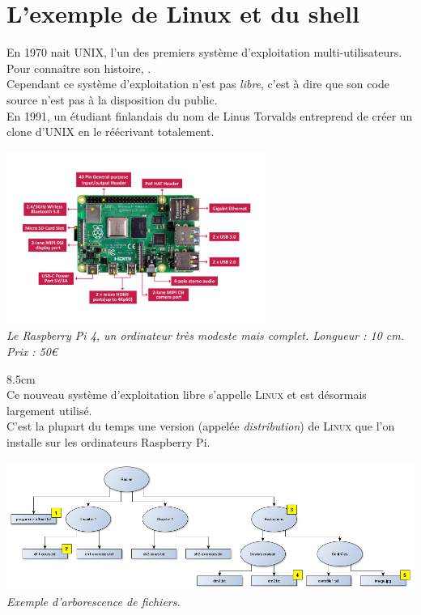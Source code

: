 \documentclass[a5paper,12pt,french,landscape]{book}
\begin{document}
	\section*{L'exemple de Linux et du shell}

	\double
	{
		En 1970 nait \textsc{UNIX}, l'un des premiers système d'exploitation multi-utilisateurs. Pour connaître son histoire,  .\\
		Cependant ce système d'exploitation n'est pas \textit{libre}, c'est à dire que son code source n'est pas à la disposition du public.\\
		En 1991, un étudiant finlandais du nom de Linus Torvalds entreprend de créer un clone d'\textsc{UNIX} en le réécrivant totalement.
	}
	{
		\begin{center}
			\includegraphics[width=8.5cm]{pi4.jpg}\\
			\footnotesize\textit{Le Raspberry Pi 4, un ordinateur très modeste mais complet. Longueur : 10 cm. Prix : 50€}
		\end{center}
	}{8.5cm}\ \\
	Ce nouveau système d'exploitation libre s'appelle \textsc{Linux} et est désormais largement utilisé.\\
	C'est la plupart du temps une version (appelée \textit{distribution}) de \textsc{Linux} que l'on installe sur les ordinateurs Raspberry Pi.
	
		\begin{center}
		\includegraphics[width=17cm]{hier.png}\\
		\footnotesize\textit{Exemple d'arborescence de fichiers.}
	\end{center}
\end{document}
